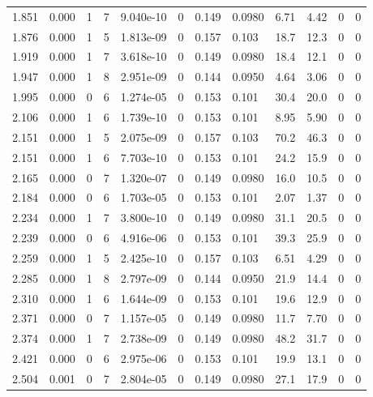 \documentclass[preview]{standalone}
\begin{document}
{{{\begin{tabular}{L{1.2cm}C{1.2cm} C{0.3cm}C{0.5cm} C{1.4cm}C{1.4cm} C{1.4cm}C{1.4cm} C{1.6cm}C{1.6cm} C{1.6cm}C{1.6cm}}
  1.851  &  0.000  & 1     &  7 &  9.040e-10  & 0  &  0.149&   0.0980& 6.71 & 4.42   &  0 & 0  \\ 
  1.876  &  0.000  & 1     &  5 &  1.813e-09  & 0  &  0.157&   0.103& 18.7 & 12.3   &  0 & 0  \\ 
  1.919  &  0.000  & 1     &  7 &  3.618e-10  & 0  &  0.149&   0.0980& 18.4 & 12.1   &  0 & 0  \\ 
  1.947  &  0.000  & 1     &  8 &  2.951e-09  & 0  &  0.144&   0.0950& 4.64 & 3.06   &  0 & 0  \\ 
  1.995  &  0.000  & 0     &  6 &  1.274e-05  & 0  &  0.153&   0.101& 30.4 & 20.0   &  0 & 0  \\ 
  2.106  &  0.000  & 1     &  6 &  1.739e-10  & 0  &  0.153&   0.101& 8.95 & 5.90   &  0 & 0  \\ 
  2.151  &  0.000  & 1     &  5 &  2.075e-09  & 0  &  0.157&   0.103& 70.2 & 46.3   &  0 & 0  \\ 
  2.151  &  0.000  & 1     &  6 &  7.703e-10  & 0  &  0.153&   0.101& 24.2 & 15.9   &  0 & 0  \\ 
  2.165  &  0.000  & 0     &  7 &  1.320e-07  & 0  &  0.149&   0.0980& 16.0 & 10.5   &  0 & 0  \\ 
  2.184  &  0.000  & 0     &  6 &  1.703e-05  & 0  &  0.153&   0.101& 2.07 & 1.37   &  0 & 0  \\ 
  2.234  &  0.000  & 1     &  7 &  3.800e-10  & 0  &  0.149&   0.0980& 31.1 & 20.5   &  0 & 0  \\ 
  2.239  &  0.000  & 0     &  6 &  4.916e-06  & 0  &  0.153&   0.101& 39.3 & 25.9   &  0 & 0  \\ 
  2.259  &  0.000  & 1     &  5 &  2.425e-10  & 0  &  0.157&   0.103& 6.51 & 4.29   &  0 & 0  \\ 
  2.285  &  0.000  & 1     &  8 &  2.797e-09  & 0  &  0.144&   0.0950& 21.9 & 14.4   &  0 & 0  \\ 
  2.310  &  0.000  & 1     &  6 &  1.644e-09  & 0  &  0.153&   0.101& 19.6 & 12.9   &  0 & 0  \\ 
  2.371  &  0.000  & 0     &  7 &  1.157e-05  & 0  &  0.149&   0.0980& 11.7 & 7.70   &  0 & 0  \\ 
  2.374  &  0.000  & 1     &  7 &  2.738e-09  & 0  &  0.149&   0.0980& 48.2 & 31.7   &  0 & 0  \\ 
  2.421  &  0.000  & 0     &  6 &  2.975e-06  & 0  &  0.153&   0.101& 19.9 & 13.1   &  0 & 0  \\ 
  2.504  &  0.001  & 0     &  7 &  2.804e-05  & 0  &  0.149&   0.0980& 27.1 & 17.9   &  0 & 0  \\ 

\end{tabular}}}}
\end{document}
